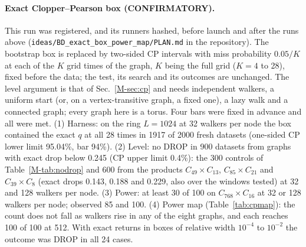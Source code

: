 \documentclass[aps,pre,twocolumn,superscriptaddress,nofootinbib,10pt]{revtex4-2}
\begin{document}
\paragraph*{Exact Clopper--Pearson box (CONFIRMATORY).}\label{sup:cp}
This run was registered, and its runners hashed, before launch and after the runs above (\texttt{ideas/BD\_exact\_box\_power\_map/PLAN.md} in the repository). The bootstrap box is replaced by two-sided CP intervals with miss probability $0.05/K$ at each of the $K$ grid times of the graph, $K$ being the full grid ($K=4$ to 28), fixed before the data; the test, its search and its outcomes are unchanged. The level argument is that of Sec.~\ref{M-sec:cp} and needs independent walkers, a uniform start (or, on a vertex-transitive graph, a fixed one), a lazy walk and a connected graph; every graph here is a torus. Four bars were fixed in advance and all were met. (1) Harness: on the ring $L=1024$ at 32 walkers per node the box contained the exact $q$ at all 28 times in 1917 of 2000 fresh datasets (one-sided CP lower limit 95.04\%, bar 94\%). (2) Level: no DROP in 900 datasets from graphs with exact drop below 0.245 (CP upper limit 0.4\%): the 300 controls of Table~\ref{M-tab:nodrop} and 600 from the products $C_{49}\times C_{13}$, $C_{85}\times C_{21}$ and $C_{39}\times C_8$ (exact drops 0.143, 0.188 and 0.229, also over the windows tested) at 32 and 128 walkers per node. (3) Power: at least 30 of 100 on $C_{768}\times C_{16}$ at 32 or 128 walkers per node; observed 85 and 100. (4) Power map (Table~\ref{tab:cpmap}): the count does not fall as walkers rise in any of the eight graphs, and each reaches 100 of 100 at 512. With exact returns in boxes of relative width $10^{-4}$ to $10^{-2}$ the outcome was DROP in all 24 cases.
\end{document}
